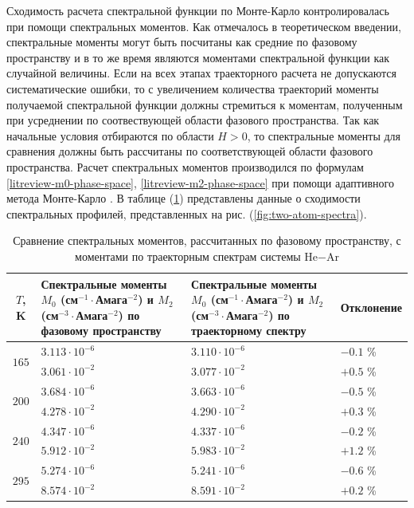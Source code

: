 Сходимость расчета спектральной функции по Монте-Карло контролировалась при помощи спектральных моментов. Как отмечалось в теоретическом введении, спектральные моменты могут быть посчитаны как средние по фазовому пространству и в то же время являются моментами спектральной функции как случайной величины. Если на всех этапах траекторного расчета не допускаются систематические ошибки, то с увеличением количества траекторий моменты получаемой спектральной функции должны стремиться к моментам, полученным при усреднении по соотвествующей области фазового пространства. Так как начальные условия отбираются по области $H > 0$, то спектральные моменты для сравнения должны быть рассчитаны по соответствующей области фазового пространства. Расчет спектральных моментов производился по формулам \eqref{litreview-m0-phase-space}, \eqref{litreview-m2-phase-space}  при помощи адаптивного метода Монте-Карло \cite{hep}. В таблице (\ref{table:hear-moments}) представлены данные о сходимости спектральных профилей, представленных на рис. (\ref{fig:two-atom-spectra}). 

\begin{table}[H]
    \caption{Сравнение спектральных моментов, рассчитанных по фазовому пространству, с моментами по траекторным спектрам системы He$-$Ar}
    \begin{tabular}{c >{\centering}p{6cm} >{\centering}p{6cm} >{\centering}p{3cm}}
        \toprule
        $T$, K & Спектральные моменты $M_0$ (см$^{-1} \cdot$Амага$^{-2}$) и $M_2$ (см$^{-3} \cdot$Амага$^{-2}$) по фазовому пространству & Спектральные моменты $M_0$ (см$^{-1} \cdot$Амага$^{-2}$) и $M_2$ (см$^{-3} \cdot$Амага$^{-2}$) по траекторному спектру & Отклонение \tabularnewline
        \midrule
        \multirow{2}{*}{$165$}  & $3.113\cdot 10^{-6}$ & $3.110 \cdot 10^{-6}$ & $-0.1$ \%  \tabularnewline
                                & $3.061\cdot 10^{-2}$ & $3.077 \cdot 10^{-2}$ & $+0.5$ \%  \tabularnewline
        \midrule
        \multirow{2}{*}{$200$}  & $3.684\cdot 10^{-6}$ & $3.663 \cdot 10^{-6}$ & $-0.5$ \%  \tabularnewline
                                & $4.278\cdot 10^{-2}$ & $4.290 \cdot 10^{-2}$ & $+0.3$ \%  \tabularnewline
        \midrule
        \multirow{2}{*}{$240$}  & $4.347\cdot 10^{-6}$ & $4.337 \cdot 10^{-6}$ & $-0.2$ \%  \tabularnewline
                                & $5.912\cdot 10^{-2}$ & $5.983 \cdot 10^{-2}$ & $+1.2$ \%  \tabularnewline
        \midrule
        \multirow{2}{*}{$295$}  & $5.274\cdot 10^{-6}$ & $5.241 \cdot 10^{-6}$ & $-0.6$ \%  \tabularnewline
                                & $8.574\cdot 10^{-2}$ & $8.591 \cdot 10^{-2}$ & $+0.2$ \%  \tabularnewline
        \bottomrule
    \end{tabular}
    \label{table:hear-moments}
\end{table}


